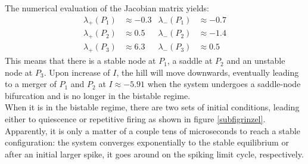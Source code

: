 \documentclass[12pt,a4paper]{article}
\begin{document}
The numerical evaluation of the Jacobian matrix yields:
\begin{align*}
\lambda_+(P_1)&\approx-0.3 & \lambda_-(P_1)&\approx-0.7\\
\lambda_+(P_2)&\approx 0.5& \lambda_-(P_2)&\approx -1.4\\
\lambda_+(P_3)&\approx 6.3& \lambda_-(P_3)&\approx 0.5
\end{align*}
This means that there is a stable node at $P_1$, a saddle at $P_2$ and an unstable node at $P_3$. Upon increase of $I$, the hill will move downwards, eventually leading to a merger of $P_1$ and $P_2$ at $I\approx -5.91$ when the system undergoes a saddle-node bifurcation and is no longer in the bistable regime.\\
When it is in the bistable regime, there are two sets of initial conditions, leading either to quiescence or repetitive firing as shown in figure \ref{subfigrinzel}.\\
Apparently, it is only a matter of a couple tens of microseconds to reach a stable configuration: the system converges exponentially to the stable equilibrium or after an initial larger spike, it goes around on the spiking limit cycle, respectively.
\end{document}
